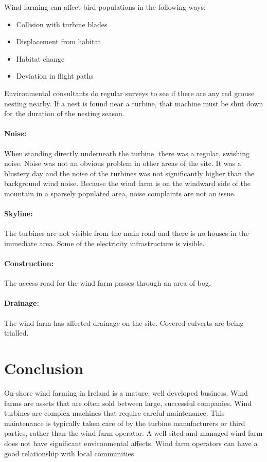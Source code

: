 \documentclass[12pt]{article} %
\newlength{\wideitemsep}
\let\olditem\item
\renewcommand{\item}{\setlength{\itemsep}{\wideitemsep}\olditem}
\begin{document}
Wind farming can affect bird populations in the following ways:
  \begin{itemize}
    \item{Collision with turbine blades}
    \item{Displacement from habitat}
    \item{Habitat change}
    \item{Deviation in flight paths}
  \end{itemize}

Environmental consultants do regular surveys to see if there are any red grouse nesting nearby. If a nest is found near a turbine, that machine must be shut down for the duration of the nesting season.

\paragraph{Noise:} When standing directly underneath the turbine, there was a regular, swishing noise. Noise was not an obvious problem in other areas of the site. It was a blustery day and the noise of the turbines was not significantly higher than the background wind noise.
Because the wind farm is on the windward side of the mountain in a sparsely populated area, noise complaints are not an issue.

\paragraph{Skyline:} The turbines are not visible from the main road and there is no houses in the immediate area. Some of the electricity infrastructure is visible.

\paragraph{Construction:} The access road for the wind farm passes through an area of bog.

\paragraph{Drainage:} The wind farm has affected drainage on the site. Covered culverts are being trialled. %


\section{Conclusion}
On-shore wind farming in Ireland is a mature, well developed business. Wind farms are assets that are often sold between large, successful companies.
Wind turbines are complex machines that require careful maintenance. This maintenance is typically taken care of by the turbine manufacturers or third parties, rather than the wind farm operator. 
A well sited and managed wind farm does not have significant environmental affects. Wind farm operators can have a good relationship with local communities
\end{document}
